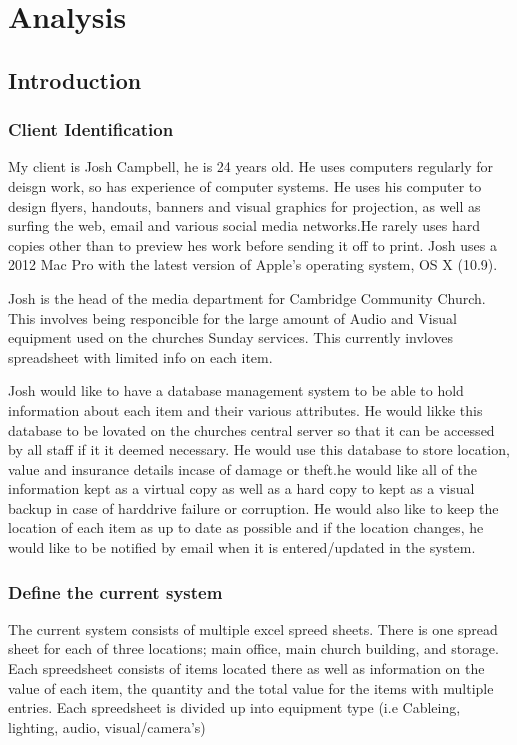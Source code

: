\documentclass[12pt]{report}
\begin{document}
\chapter{Analysis}

\section{Introduction}

\subsection{Client Identification}

My client is Josh Campbell, he is 24 years old. He uses computers regularly for deisgn work, so has experience of computer systems. He uses his computer to design flyers, handouts, banners and visual graphics for projection, as well as surfing the web, email and various social media networks.He rarely uses hard copies other than to preview hes work before sending it off to print. Josh uses a 2012 Mac Pro with the latest version of Apple's operating system, OS X (10.9).

Josh is the head of the media department for Cambridge Community Church. This involves being responcible for the large amount of Audio and Visual equipment used on the churches Sunday services. This currently invloves spreadsheet with limited info on each item. 

Josh would like to have a database management system to be able to hold information about each item and their various attributes. He would likke this database to be lovated on the churches central server so that it can be accessed by all staff if it it deemed necessary. He would use this database to store location, value and insurance details incase of damage or theft.he would like all of the information kept as a virtual copy as well as a hard copy to kept as a visual backup in case of harddrive failure or corruption. He would also like to keep the location of each item as up to date as possible and if the location changes, he would like to be notified by email when it is entered/updated in the system.

\subsection{Define the current system}

The current system consists of multiple excel spreed sheets. There is one spread sheet for each of three locations; main office, main church building, and storage. Each spreedsheet consists of items located there as well as information on the value of each item, the quantity and the total value for the items with multiple entries. Each spreedsheet is divided up into equipment type (i.e Cableing, lighting, audio, visual/camera's) 
\end{document}
